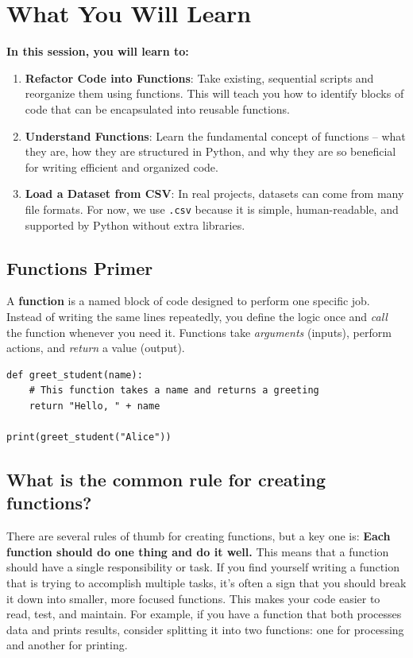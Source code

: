 \section{What You Will Learn}
\textbf{In this session, you will learn to:}
\begin{enumerate}\setlength{\itemsep}{5pt}
\item \textbf{Refactor Code into Functions}: Take existing, sequential scripts and reorganize them using functions. This will teach you how to identify blocks of code that can be encapsulated into reusable functions.
\item \textbf{Understand Functions}: Learn the fundamental concept of functions -- what they are, how they are structured in Python, and why they are so beneficial for writing efficient and organized code.
\item \textbf{Load a Dataset from CSV}: In real projects, datasets can come from many file formats. For now, we use \texttt{.csv} because it is simple, human-readable, and supported by Python without extra libraries.
\end{enumerate}

\subsection{Functions Primer}
A \textbf{function} is a named block of code designed to perform one specific job. Instead of writing the same lines repeatedly, you define the logic once and \textit{call} the function whenever you need it. Functions take \textit{arguments} (inputs), perform actions, and \textit{return} a value (output).

\begin{verbatim}
def greet_student(name):
    # This function takes a name and returns a greeting
    return "Hello, " + name

print(greet_student("Alice"))
\end{verbatim}

\subsection{What is the common rule for creating functions?}
There are several rules of thumb for creating functions, but a key one is: \textbf{Each function should do one thing and do it well.} This means that a function should have a single responsibility or task. If you find yourself writing a function that is trying to accomplish multiple tasks, it's often a sign that you should break it down into smaller, more focused functions. This makes your code easier to read, test, and maintain. For example, if you have a function that both processes data and prints results, consider splitting it into two functions: one for processing and another for printing.

